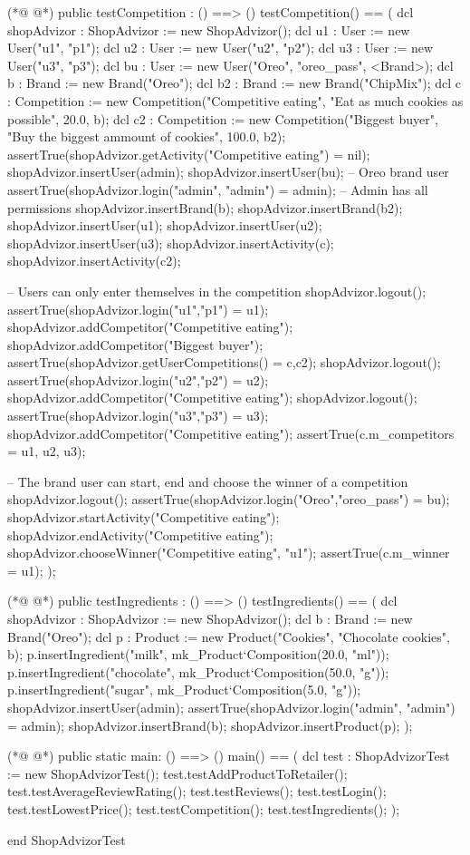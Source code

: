 \begin{vdmpp}[breaklines=true]
(*@
\label{testCompetition:161}
@*)
  public testCompetition : () ==> ()
  testCompetition() == 
  (
   dcl shopAdvizor : ShopAdvizor := new ShopAdvizor();
  dcl u1 : User := new User("u1", "p1");
  dcl u2 : User := new User("u2", "p2");
  dcl u3 : User := new User("u3", "p3");
  dcl bu : User := new User("Oreo", "oreo_pass", <Brand>);
  dcl b : Brand := new Brand("Oreo");
  dcl b2 : Brand := new Brand("ChipMix");
  dcl c : Competition := new Competition("Competitive eating", "Eat as much cookies as possible", 20.0, b);
  dcl c2 : Competition := new Competition("Biggest buyer", "Buy the biggest ammount of cookies", 100.0, b2);
  assertTrue(shopAdvizor.getActivity("Competitive eating") = nil);
  shopAdvizor.insertUser(admin);
  shopAdvizor.insertUser(bu); -- Oreo brand user
  assertTrue(shopAdvizor.login("admin", "admin") = admin); -- Admin has all permissions
  shopAdvizor.insertBrand(b);
  shopAdvizor.insertBrand(b2);
  shopAdvizor.insertUser(u1);
  shopAdvizor.insertUser(u2);
  shopAdvizor.insertUser(u3);
  shopAdvizor.insertActivity(c);
  shopAdvizor.insertActivity(c2);
  
  -- Users can only enter themselves in the competition
  shopAdvizor.logout();
  assertTrue(shopAdvizor.login("u1","p1") = u1);
  shopAdvizor.addCompetitor("Competitive eating");
  shopAdvizor.addCompetitor("Biggest buyer");
  assertTrue(shopAdvizor.getUserCompetitions() = {c,c2});
  shopAdvizor.logout();
  assertTrue(shopAdvizor.login("u2","p2") = u2);
  shopAdvizor.addCompetitor("Competitive eating");
  shopAdvizor.logout();
  assertTrue(shopAdvizor.login("u3","p3") = u3);
  shopAdvizor.addCompetitor("Competitive eating");
  assertTrue(c.m_competitors = {u1, u2, u3});
  
  -- The brand user can start, end and choose the winner of a competition
  shopAdvizor.logout();
  assertTrue(shopAdvizor.login("Oreo","oreo_pass") = bu);
  shopAdvizor.startActivity("Competitive eating");
  shopAdvizor.endActivity("Competitive eating");
  shopAdvizor.chooseWinner("Competitive eating", "u1");
  assertTrue(c.m_winner = u1);
  );
  
(*@
\label{testIngredients:208}
@*)
  public testIngredients : () ==> ()
  testIngredients() ==
  (
   dcl shopAdvizor : ShopAdvizor := new ShopAdvizor();
  dcl b : Brand := new Brand("Oreo");
  dcl p : Product := new Product("Cookies", "Chocolate cookies", b);
  p.insertIngredient("milk", mk_Product`Composition(20.0, "ml"));
  p.insertIngredient("chocolate", mk_Product`Composition(50.0, "g"));
  p.insertIngredient("sugar", mk_Product`Composition(5.0, "g"));
  shopAdvizor.insertUser(admin);
  assertTrue(shopAdvizor.login("admin", "admin") = admin);
  shopAdvizor.insertBrand(b);
  shopAdvizor.insertProduct(p);
  );
  
(*@
\label{main:223}
@*)
  public static main: () ==> ()
  main() ==
  (
   dcl test : ShopAdvizorTest := new ShopAdvizorTest();
   test.testAddProductToRetailer();
   test.testAverageReviewRating();
   test.testReviews();
   test.testLogin();
   test.testLowestPrice();
   test.testCompetition();
   test.testIngredients();
  );
  
end ShopAdvizorTest
\end{vdmpp}
